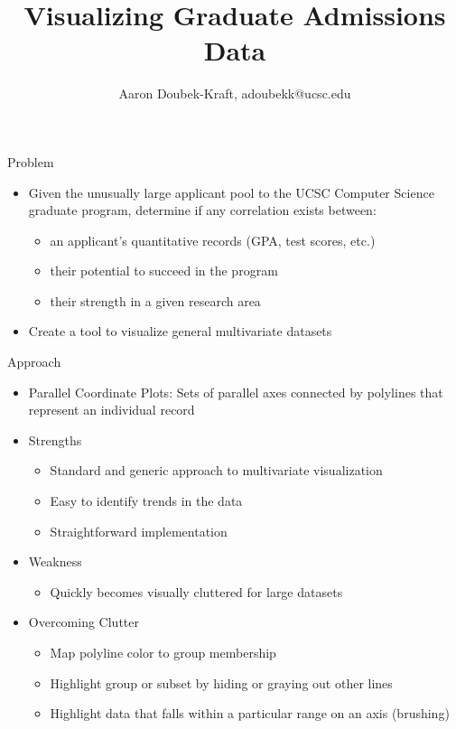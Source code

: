 \documentclass{beamer}
\title{Visualizing Graduate Admissions Data}
\author{Aaron Doubek-Kraft, adoubekk@ucsc.edu}
\begin{document}
	
	\begin{frame}{Problem}
		\begin{itemize}
			\item Given the unusually large applicant pool to the UCSC Computer Science graduate program, determine if any correlation exists between:
			\begin{itemize} \item an applicant's quantitative records (GPA, test scores, etc.) 
							\item their potential to succeed in the program
							\item their strength in a given research area
			\end{itemize}
			\item Create a tool to visualize general multivariate datasets
		\end{itemize}	
	\end{frame}
	
	\begin{frame}{Approach}
		\begin{itemize}
			\item Parallel Coordinate Plots: Sets of parallel axes connected by polylines that represent an individual record
			\item Strengths
			\begin{itemize}
				\item Standard and generic approach to multivariate visualization
				\item Easy to identify trends in the data
				\item Straightforward implementation
			\end{itemize}
			\item Weakness
			\begin{itemize}
				\item Quickly becomes visually cluttered for large datasets
			\end{itemize}
			\item Overcoming Clutter
			\begin{itemize}
				\item Map polyline color to group membership
				\item Highlight group or subset by hiding or graying out other lines
				\item Highlight data that falls within a particular range on an axis (brushing)
			\end{itemize}
		\end{itemize}
	
	\end{frame}
	
\end{document}
